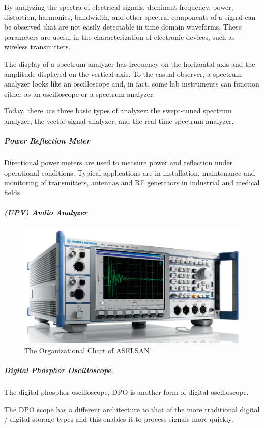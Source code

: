 By analyzing the spectra of electrical signals, dominant frequency, power, distortion, harmonics, bandwidth, and other spectral components of a signal can be observed that are not easily detectable in time domain waveforms. These parameters are useful in the characterization of electronic devices, such as wireless transmitters.

The display of a spectrum analyzer has frequency on the horizontal axis and the amplitude displayed on the vertical axis. To the casual observer, a spectrum analyzer looks like an oscilloscope and, in fact, some lab instruments can function either as an oscilloscope or a spectrum analyzer.

	Today, there are three basic types of analyzer: the swept-tuned spectrum analyzer, the vector signal analyzer, and the real-time spectrum analyzer.
	
\subparagraph{Power Reflection Meter}
	
	Directional power meters are used to
measure power and reflection under
operational conditions. Typical applications
are in installation, maintenance and
monitoring of transmitters, antennas and
RF generators in industrial and medical
fields. 

\subparagraph{(UPV) Audio Analyzer}

\begin{figure}[H]
	\center
	\setlength{\unitlength}{\textwidth} 
	\includegraphics[width=1.0\unitlength]{audany}
	\caption{\label{fig:audany}The Organizational Chart of ASELSAN }
\end{figure}

\subparagraph{Digital Phosphor Oscilloscope}

	The digital phosphor oscilloscope, DPO is another form of digital oscilloscope.

The DPO scope has a different architecture to that of the more traditional digital / digital storage types and this enables it to process signals more quickly.

